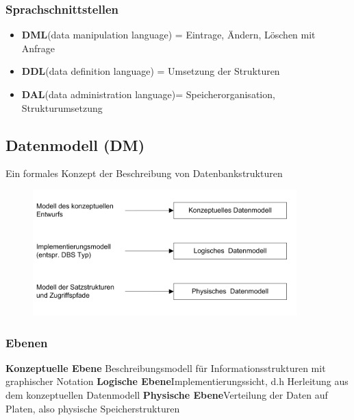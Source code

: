 \documentclass[a4paper,10pt]{scrartcl}
\begin{document}
\subsubsection{Sprachschnittstellen}
\begin{itemize}
    \item \textbf{DML}(data manipulation language) = Eintrage, Ändern, Löschen mit Anfrage
    \item \textbf{DDL}(data definition language) = Umsetzung der Strukturen
    \item \textbf{DAL}(data administration language)= Speicherorganisation, Strukturumsetzung
\end{itemize}

\subsection{Datenmodell (DM)}
Ein formales Konzept der Beschreibung von Datenbankstrukturen
\begin{figure}[h]
	\centering
	\includegraphics{Datenmodelle.PNG}
	\label{img:grafik-dummy}
\end{figure}

\subsubsection{Ebenen}
\textbf{Konzeptuelle Ebene}\newline
Beschreibungsmodell für Informationsstrukturen mit graphischer Notation
\newline\textbf{Logische Ebene}\newline Implementierungssicht, d.h Herleitung aus dem konzeptuellen Datenmodell 
\newline\textbf{Physische Ebene}\newline Verteilung der Daten auf Platen, also physische Speicherstrukturen
\end{document}
